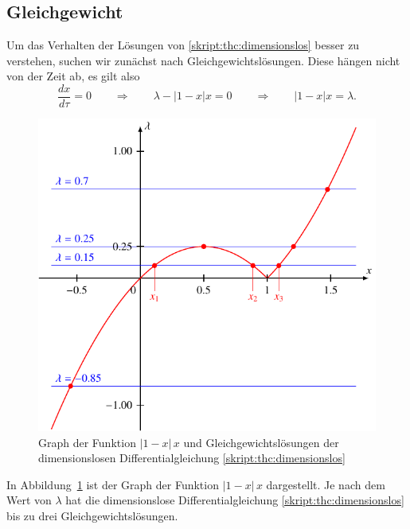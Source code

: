 \subsection{Gleichgewicht}
Um das Verhalten der Lösungen von 
\eqref{skript:thc:dimensionslos}
besser zu verstehen, suchen wir zunächst nach Gleichgewichtslösungen.
Diese hängen nicht von der Zeit ab, es gilt also
\begin{equation}
\frac{dx}{d\tau}=0
\qquad\Rightarrow\qquad
\lambda-|1-x|x=0
\qquad\Rightarrow\qquad
|1-x|x
=
\lambda.
\label{skript:thc:lambdagl}
\end{equation}
\begin{figure}
\centering
\includegraphics{chapters/4/rhs.pdf}
\caption{Graph der Funktion $|1-x|\,x$ und
Gleichgewichtslösungen der dimensionslosen Differentialgleichung
\eqref{skript:thc:dimensionslos}
\label{skript:thc:1-xxgraph}}
\end{figure}%
In Abbildung~\ref{skript:thc:1-xxgraph} ist der Graph der Funktion 
$|1-x|\,x$ dargestellt.
Je nach dem Wert von $\lambda$ hat die dimensionslose Differentialgleichung
\eqref{skript:thc:dimensionslos} bis zu drei Gleichgewichtslösungen.

